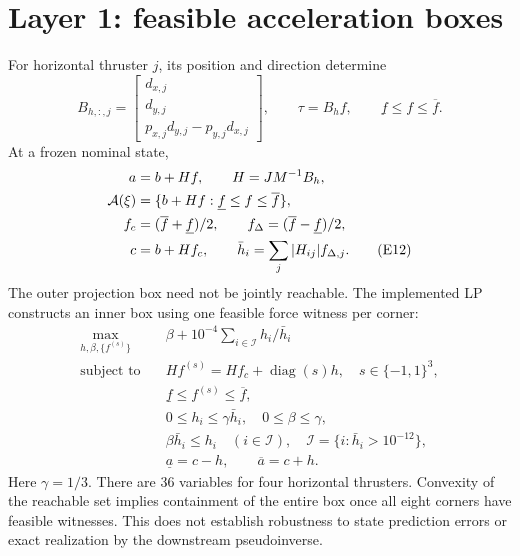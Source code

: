 \documentclass[11pt,a4paper]{article}
\newcommand{\diag}{\operatorname{diag}}
\begin{document}
\section{Layer 1: feasible acceleration boxes}
For horizontal thruster $j$, its position and direction determine
\begin{equation}
B_{h,:,j}=\begin{bmatrix}d_{x,j}\\d_{y,j}\\p_{x,j}d_{y,j}-p_{y,j}d_{x,j}\end{bmatrix},\qquad
\tau=B_hf,\qquad \underline f\le f\le\overline f.\tag{E11}
\end{equation}
At a frozen nominal state,
\begin{align}
a&=b+Hf,\qquad H=JM^{-1}B_h,\notag\\
\mathcal A(\xi)&=\{b+Hf:\underline f\le f\le\overline f\},\notag\\
f_c&=(\overline f+\underline f)/2,\qquad f_\Delta=(\overline f-\underline f)/2,\notag\\
c&=b+Hf_c,\qquad\bar h_i=\sum_j|H_{ij}|f_{\Delta,j}.\tag{E12}
\end{align}
The outer projection box need not be jointly reachable. The implemented LP
constructs an inner box using one feasible force witness per corner:
\begin{equation}
\begin{aligned}
\max_{h,\beta,\{f^{(s)}\}}\quad &\beta+10^{-4}\sum_{i\in\mathcal I}h_i/\bar h_i\\
\text{subject to}\quad
&Hf^{(s)}=Hf_c+\diag(s)h,\quad s\in\{-1,1\}^3,\\
&\underline f\le f^{(s)}\le\overline f,\\
&0\le h_i\le\gamma\bar h_i,\quad0\le\beta\le\gamma,\\
&\beta\bar h_i\le h_i\quad(i\in\mathcal I),\quad
\mathcal I=\{i:\bar h_i>10^{-12}\},\\
&\underline a=c-h,\qquad\overline a=c+h.
\end{aligned}\tag{E13}
\end{equation}
Here $\gamma=1/3$. There are 36 variables for four horizontal thrusters.
Convexity of the reachable set implies containment of the entire box once all
eight corners have feasible witnesses. This does not establish robustness to
state prediction errors or exact realization by the downstream pseudoinverse.
\end{document}
